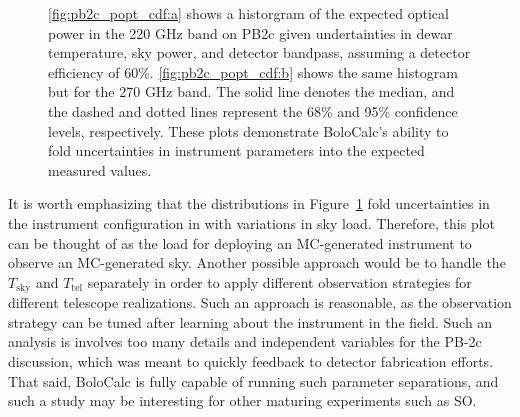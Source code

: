 \begin{figure}[!t]
    \centering
    \caption[Expected optical power for PB2c in both the 220 and 270 GHz bands as simulated by BoloCalc]{\ref{fig:pb2c_popt_cdf:a} shows a historgram of the expected optical power in the 220 GHz band on PB2c given undertainties in dewar temperature, sky power, and detector bandpass, assuming a detector efficiency of 60\%. \ref{fig:pb2c_popt_cdf:b} shows the same histogram but for the 270 GHz band. The solid line denotes the median, and the dashed and dotted lines represent the 68\% and 95\% confidence levels, respectively. These plots demonstrate BoloCalc's ability to fold uncertainties in instrument parameters into the expected measured values.}
    \label{fig:pb2c_popt_cdf}
\end{figure}

It is worth emphasizing that the distributions in Figure~\ref{fig:pb2c_popt_cdf} fold uncertainties in the instrument configuration in with variations in sky load. Therefore, this plot can be thought of as the load for deploying an MC-generated instrument to observe an MC-generated sky. Another possible approach would be to handle the $T_{\mathrm{sky}}$ and $T_{\mathrm{tel}}$ separately in order to apply different observation strategies for different telescope realizations. Such an approach is reasonable, as the observation strategy can be tuned after learning about the instrument in the field. Such an analysis is involves too many details and independent variables for the PB-2c discussion, which was meant to quickly feedback to detector fabrication efforts. That said, BoloCalc is fully capable of running such parameter separations, and such a study may be interesting for other maturing experiments such as SO.

